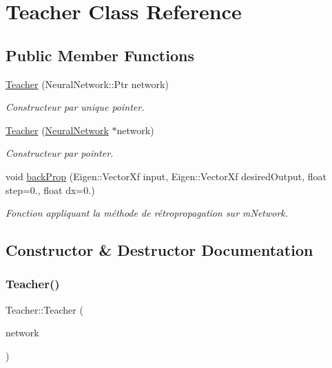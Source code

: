 \hypertarget{classTeacher}{}\section{Teacher Class Reference}
\label{classTeacher}
\subsection*{Public Member Functions}
\begin{DoxyCompactItemize}
\item 
\hyperlink{classTeacher_a8ca95fc7a29e082a676d420b9fd8fd67}{Teacher} (Neural\+Network\+::\+Ptr network)
\begin{DoxyCompactList}\small\item\em Constructeur par unique pointer. \end{DoxyCompactList}\item 
\hyperlink{classTeacher_afd32ab70242f2c5886d030a5e7d05919}{Teacher} (\hyperlink{classNeuralNetwork}{Neural\+Network} $\ast$network)
\begin{DoxyCompactList}\small\item\em Constructeur par pointer. \end{DoxyCompactList}\item 
void \hyperlink{classTeacher_a99fc69c5319be890394d2c8503e217c8}{back\+Prop} (Eigen\+::\+Vector\+Xf input, Eigen\+::\+Vector\+Xf desired\+Output, float step=0., float dx=0.)
\begin{DoxyCompactList}\small\item\em Fonction appliquant la méthode de rétropropagation sur m\+Network. \end{DoxyCompactList}\end{DoxyCompactItemize}


\subsection{Constructor \& Destructor Documentation}
\mbox{\label{classTeacher_a8ca95fc7a29e082a676d420b9fd8fd67}} 
\subsubsection{\texorpdfstring{Teacher()}{Teacher()}\hspace{0.1cm}{\footnotesize\ttfamily [1/2]}}
{\footnotesize\ttfamily Teacher\+::\+Teacher (\begin{DoxyParamCaption}\item[{Neural\+Network\+::\+Ptr}]{network }\end{DoxyParamCaption})}




